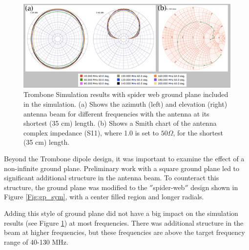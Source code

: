 \begin{figure}[htb]
\begin{center}
\includegraphics[width=0.95\linewidth]{SCIHI_system/figures/trombone_gp.jpg}
\caption{Trombone Simulation results with spider web ground plane included in the simulation. (a) Shows the azimuth (left) and elevation (right) antenna beam for different frequencies with the antenna at its shortest (35 cm) length. (b) Shows a Smith chart of the antenna complex impedance (S11), where 1.0 is set to $50 \Omega$, for the shortest (35 cm) length.}
\label{Fig:trsym_gp}
\end{center}
\end{figure}

Beyond the Trombone dipole design, it was important to examine the effect of a non-infinite ground plane. Preliminary work with a square ground plane led to significant additional structure in the antenna beam. To counteract this structure, the ground plane was modified to the $''$spider-web$''$ design shown in Figure \ref{Fig:gp_sym}, with a center filled region and longer radials. 

Adding this style of ground plane did not have a big impact on the simulation results (see Figure \ref{Fig:trsym_gp}) at most frequencies. There was additional structure in the beam at higher frequencies, but these frequencies are above the target frequency range of 40-130 MHz.  

